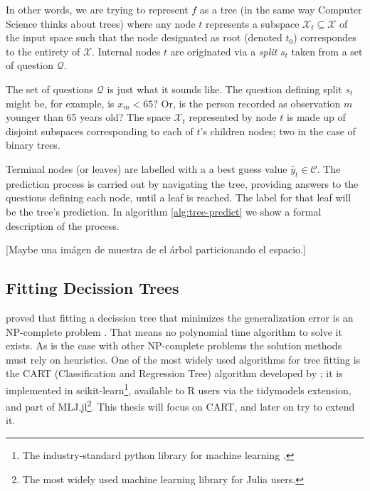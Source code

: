 In other words, we are trying to represent $f$ as a tree (in the same way
Computer Science thinks about trees) where any node $t$ represents a subspace
$\mathcal{X}_t \subseteq \mathcal{X}$ of the input space such that the node
designated as root (denoted $t_0$) correspondes to the entirety of
$\mathcal{X}$. Internal nodes $t$ are originated via a \textit{split} $s_t$
taken from a set of question $\mathcal{Q}$.

The set of questions $\mathcal{Q}$ is just what it sounds like. The question
defining split $s_t$ might be, for example, is $x_m < 65$? Or, is the person
recorded as observation $m$ younger than 65 years old? The space $\mathcal{X}_t$
represented by node $t$ is made up of disjoint subspaces corresponding to each
of $t$'s children nodes; two in the case of binary trees. 

Terminal nodes (or leaves) are labelled with a a best guess value $\widehat{y}_t
\in \mathcal{C}$. The prediction process is carried out by navigating the tree,
providing answers to the questions defining each node, until a leaf is reached.
The label for that leaf will be the tree's prediction. In algorithm
\ref{alg:tree-predict} we show a formal description of the process.

\begin{algorithm}
    \caption{Predict output value $\widehat{y}$ with tree $f_\L$
        \cite[Ch.~3.2]{louppe2014}.}
    \label{alg:tree-predict}
\end{algorithm}

[Maybe una imágen de muestra de el árbol particionando el espacio.]

\subsection{Fitting Decission Trees}
\citeauthor{hyafil1976} proved that fitting
a decission tree that minimizes the generalization error is an NP-complete
problem \cite{hyafil1976}. That means no polynomial time algorithm to solve it
exists. As is the case with other NP-complete problems the solution methods must
rely on heuristics. One of the most widely used algorithms for tree fitting is
the CART (Classification and Regression Tree) algorithm developed by
\citeauthor{breiman2017} \cite{breiman2017}; it is implemented in
scikit-learn\footnote{The industry-standard python library for machine learning
\cite{louppe2014}.}, available to R users via the tidymodels extension, and part
of MLJ.jl\footnote{The most widely used machine learning library for Julia
users.}. This thesis will focus on CART, and later on try to extend it.

